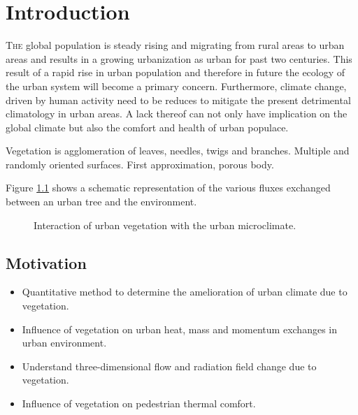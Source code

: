 \chapter{Introduction}
\label{ch:introduction}

\def\figdir{chapters/introduction/figures/}


%		

\lettrine[lines=3,nindent=0em,loversize=0.1]{T}{he} global population is steady rising and migrating from rural areas to urban areas and results in a growing urbanization as urban for past two centuries. This result of a rapid rise in urban population and therefore in future the ecology of the urban system will become a primary concern. Furthermore, climate change, driven by human activity need to be reduces to mitigate the present detrimental climatology in urban areas. A lack thereof can not only have implication on the global climate but also the comfort and health of urban populace. 

Vegetation is agglomeration of leaves, needles, twigs and branches. Multiple and randomly oriented surfaces. First approximation, porous body. 


 Figure \ref{fig:vegetation_fluxes} shows a schematic representation of the various fluxes exchanged between an urban tree and the environment. 

\begin{figure}[h]
	\centering
	\caption{Interaction of urban vegetation with the urban microclimate.}
	\label{fig:vegetation_fluxes}
\end{figure}	

\section{Motivation}


\begin{itemize}
	\item Quantitative method to determine the amelioration of urban climate due to vegetation.
	\item Influence of vegetation on urban heat, mass and momentum exchanges in urban environment.
	\item Understand three-dimensional flow and radiation field change due to vegetation.
	\item Influence of vegetation on pedestrian thermal comfort. 
\end{itemize}

